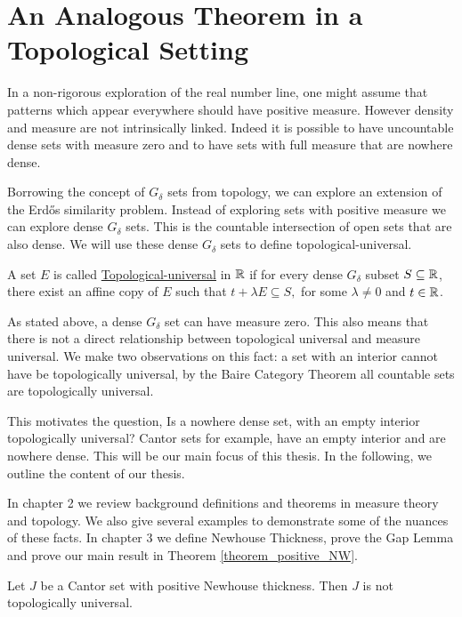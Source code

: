 \section{An Analogous Theorem in a Topological Setting}

In a non-rigorous exploration of the real number line, one might assume that patterns which appear everywhere should have positive measure.  However density and measure are not intrinsically linked.  Indeed it is possible to have uncountable dense sets with measure zero and to have sets with full measure that are nowhere dense.  

Borrowing the concept of $G_\delta$ sets from topology, we can explore an extension of the Erd\H{o}s similarity problem.  Instead of exploring sets with positive measure we can explore dense $G_\delta$ sets.  This is the countable intersection of open sets that are also dense.  We will use these dense $G_\delta$ sets to define topological-universal. 

\begin{definition}
    A set $E$ is called \underline{Topological-universal} in $\mathbb{R}$ if for every dense $G_\delta$ subset $S \subseteq \mathbb{R}$, there exist an affine copy of $E$ such that $t+\lambda E \subseteq S,$ for some $\lambda \neq 0$ and $t \in \mathbb{R}$.  
\end{definition}

As stated above, a dense $G_\delta$ set can have measure zero.  This also means that there is not a direct relationship between topological universal and measure universal.  We make two observations on this fact: a set with an interior cannot have be topologically universal, by the Baire Category Theorem all countable sets are topologically universal.   

This motivates the question, Is a nowhere dense set, with an empty interior topologically universal?  Cantor sets for example, have an empty interior and are nowhere dense. This will be our main focus of this thesis. In the following, we outline the content of our thesis. 



In chapter 2 we review background definitions and theorems in measure theory and topology.  We also give several examples to demonstrate some of the nuances of these facts.  In chapter 3 we define Newhouse Thickness, prove the Gap Lemma and prove our main result in Theorem \ref{theorem_positive_NW}.

\begin{theorem}
Let $J$ be a Cantor set with positive Newhouse thickness.  Then $J$ is not topologically universal.
\end{theorem}


